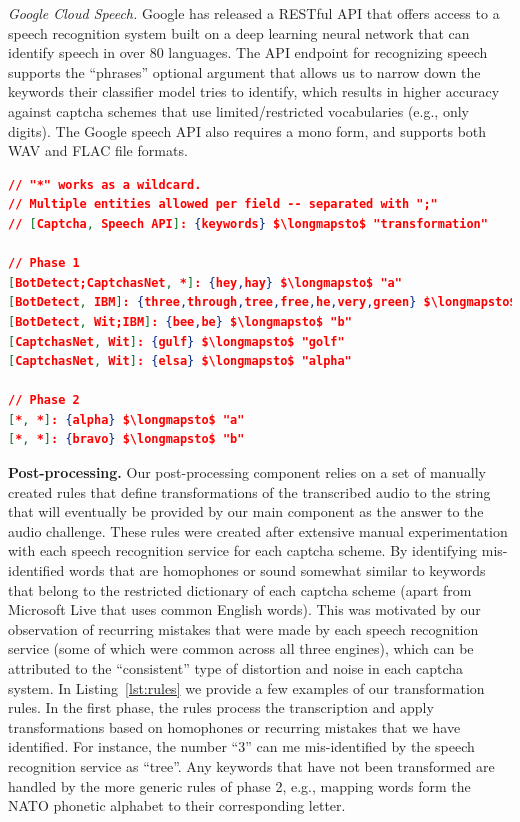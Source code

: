 \emph{Google Cloud Speech.}  Google has released a RESTful API that offers access to a speech recognition system built on 
a deep learning neural network that can identify speech in over 80 languages. The API endpoint for recognizing speech supports
the ``phrases'' optional argument that allows us to narrow down the keywords their classifier model tries to identify, which 
results in higher accuracy against captcha schemes that use limited/restricted vocabularies (e.g., only digits). The Google
speech API also requires a mono form, and supports both WAV and FLAC file formats.

\begin{lstlisting}[language=json,firstnumber=1,mathescape=true,caption={Subset of rules used by our post-processing component for
converting keywords in the transcription to the required transformation for the captcha's solution.},label={lst:rules}]
// "*" works as a wildcard. 
// Multiple entities allowed per field -- separated with ";"
// [Captcha, Speech API]: {keywords} $\longmapsto$ "transformation"

// Phase 1
[BotDetect;CaptchasNet, *]: {hey,hay} $\longmapsto$ "a"
[BotDetect, IBM]: {three,through,tree,free,he,very,green} $\longmapsto$ "3"
[BotDetect, Wit;IBM]: {bee,be} $\longmapsto$ "b"
[CaptchasNet, Wit]: {gulf} $\longmapsto$ "golf"
[CaptchasNet, Wit]: {elsa} $\longmapsto$ "alpha"

// Phase 2
[*, *]: {alpha} $\longmapsto$ "a"
[*, *]: {bravo} $\longmapsto$ "b"
\end{lstlisting}


\textbf{Post-processing.} Our post-processing component relies on a set of manually created rules that define transformations
of the transcribed audio to the string that will eventually be provided by our main component as the answer to the audio challenge.
These rules were created after extensive manual experimentation with each speech recognition service for each captcha scheme.
By identifying mis-identified words that are homophones or sound somewhat similar to keywords that belong to the 
restricted dictionary of each captcha scheme (apart from Microsoft Live that uses common English words). This was motivated
by our observation of recurring mistakes that were made by each speech recognition service (some of which were common across
all three engines), which can be attributed to the ``consistent'' type of distortion and noise in each captcha system.
In Listing~\ref{lst:rules} we provide a few examples of our transformation rules. In the first phase, the rules process the 
transcription and apply transformations based on homophones or recurring mistakes that we have identified. For instance, 
the number ``3'' can me mis-identified by the speech recognition service as ``tree''. Any keywords that have not been 
transformed are handled by the more generic rules of phase 2, e.g., mapping words form the NATO phonetic alphabet to 
their corresponding letter.

